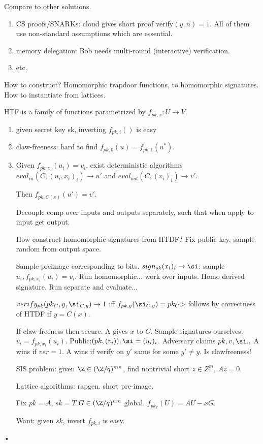 Compare to other solutions.
\begin{enumerate}
\item
CS proofs/SNARKs: cloud gives short proof verify$(y,n)=1$. All of them use non-standard assumptions which are essential.
\item
memory delegation: Bob needs multi-round (interactive) verification.
\item
etc. 
\end{enumerate}

How to construct? Homomorphic trapdoor functions, to homomorphic signatures. How to instantiate from lattices.


HTF is a family of functions parametrized by $f_{pk,x}:U\to V$. 
\begin{enumerate}
\item
given secret key sk, inverting $f_{pk,i}()$ is easy
\item claw-freeness: hard to find $f_{pk,0}(u)=f_{pk,1}(u^*)$. 
\item
Given $f_{pk,x_i}(u_i)=v_i$, exist deterministic algorithms 
$eval_{in}(C,(u_i,x_i)_i) \to u'$ and $eval_{out}(C,(v_i)_i)\to v'$.

Then $f_{pk, C(x)}(u')=v'$. 

Decouple comp over inputs and outputs separately, such that when apply to input get output.

How construct homomorphic signatures from HTDF? Fix public key, sample random from output space. 

Sample preimage corresponding to bits. 
$sign_{sk}(x_i)_i \to \si$: sample $u_i,f_{pk,x_i}(u_i)=v_i$. Run homomorphic... work over inputs. Homo derived signature. 
Run separate and evaluate...

$verify_{pk}(pk_C,y,\si_{C,y}) \to 1$ iff $f_{pk,y}(\si_{C,y})=pk_C$> follows by correctness of HTDF if $y=C(x)$.

If claw-freeness then secure. A gives $x$ to $C$. Sample signatures ourselves: $v_i=f_{pk,x_i}(u_i)$. Public:$ (pk,(v_i)), \si=(u_i)_i$. Adversary claims $pk, v,\si..$ A wins if $ver=1$. A wins if verify on $y'$ same for some $y'\ne y$. Is clawfreeness!

SIS problem: given $\Z\in (\Z/q)^{mn}$, find nontrivial short $z\in Z^m$, $Az=0$. 

Lattice algorithms: rapgen. short pre-image.

Fix $pk=A$, $sk=T$.$G\in (\Z/q)^{nm}$ global. $f_{pk_x}(U)=AU-xG$.

Want: given $sk$, invert $f_{pk,i}$ is easy.
\end{enumerate}•
